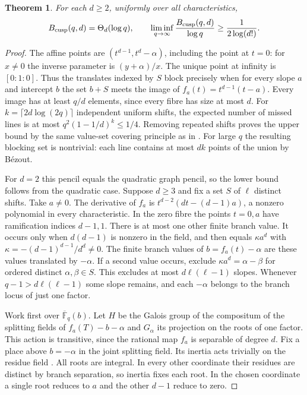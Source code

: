 \documentclass[preprint,12pt,numbers]{elsarticle}
\newtheorem{theorem}{Theorem}[section]
\begin{document}
\begin{theorem}\label{thm:cusp-general}
For each $d\ge2$, uniformly over all characteristics,
\[
 B_{\rm cusp}(q,d)=\Theta_d(\log q),\qquad
 \liminf_{q\to\infty}\frac{B_{\rm cusp}(q,d)}{\log q}
                 \ge\frac{1}{2\log(d!)} .
\]
\end{theorem}

\begin{proof}
The affine points are $(t^{d-1},t^d-\alpha)$, including the point
at $t=0$: for $x\ne0$ the inverse parameter is $(y+\alpha)/x$.
The unique point at infinity is $[0:1:0]$. Thus the translates
indexed by $S$ block precisely when for every slope $a$ and intercept
$b$ the set $b+S$ meets the image of $f_a(t)=t^{d-1}(t-a)$.
Every image has at least $q/d$ elements, since every fibre has size
at most $d$. For $k=\lceil2d\log(2q)\rceil$ independent uniform
shifts, the expected number of missed lines is at most
$q^2(1-1/d)^k\le1/4$. Removing repeated shifts proves the upper
bound by the same value-set covering principle as in
\cite[Theorem~5.1]{AGY}. For large $q$ the resulting blocking set is nontrivial:
each line contains at most $dk$ points of the union by B\'ezout.

For $d=2$ this pencil equals the quadratic graph pencil, so the
lower bound follows from the quadratic case. Suppose $d\ge3$ and
fix a set $S$ of $\ell$ distinct shifts. Take $a\ne0$. The derivative
of $f_a$ is $t^{d-2}(dt-(d-1)a)$, a nonzero polynomial in every
characteristic. In the zero fibre the points $t=0,a$ have
ramification indices $d-1,1$. There is at most one other finite
branch value. It occurs only when $d(d-1)$ is nonzero in the field,
and then equals $\kappa a^d$ with
$\kappa=-(d-1)^{d-1}/d^d\ne0$. The finite branch values of
$b=f_a(t)-\alpha$ are these values translated by $-\alpha$.
If a second value occurs, exclude $\kappa a^d=\alpha-\beta$ for
ordered distinct $\alpha,\beta\in S$. This excludes at most
$d\ell(\ell-1)$ slopes. Whenever $q-1>d\ell(\ell-1)$ some slope
remains, and each $-\alpha$ belongs to the branch locus of just
one factor.

Work first over $\overline{\mathbb F}_q(b)$. Let $H$ be the Galois
group of the compositum of the splitting fields of
$f_a(T)-b-\alpha$ and $G_\alpha$ its projection on the roots of one
factor. This action is transitive, since the rational map $f_a$ is
separable of degree $d$. Fix a place above $b=-\alpha$ in the joint
splitting field. Its inertia acts trivially on the residue field
\cite[Tag 09EC]{Stacks}. All roots are integral. In every other
coordinate their residues are distinct by branch separation, so
inertia fixes each root. In the chosen coordinate a single root
reduces to $a$ and the other $d-1$ reduce to zero.


\end{proof}
\end{document}
